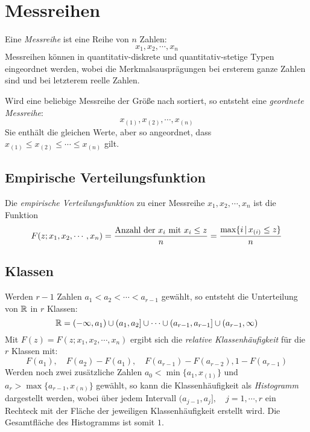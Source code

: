 	\section{Messreihen}
		Eine \textit{Messreihe} ist eine Reihe von \(n\) Zahlen:
		\begin{equation*}
			x_1, x_2, \cdots, x_n
		\end{equation*}
		Messreihen können in quantitativ-diskrete und quantitativ-stetige Typen eingeordnet werden, wobei die Merkmalsausprägungen bei ersterem ganze Zahlen sind und bei letzterem reelle Zahlen.

		Wird eine beliebige Messreihe der Größe nach sortiert, so entsteht eine \textit{geordnete Messreihe}:
		\begin{equation*}
			x_{(1)}, x_{(2)}, \cdots, x_{(n)}
		\end{equation*}
		Sie enthält die gleichen Werte, aber so angeordnet, dass \( x_{(1)} \leq x_{(2)} \leq \cdots \leq x_{(n)} \) gilt.

		\subsection{Empirische Verteilungsfunktion}
			Die \textit{empirische Verteilungsfunktion} zu einer Messreihe \( x_1, x_2, \cdots, x_n \) ist die Funktion
			\begin{equation*}
				F(z; x_1, x_2, \cdots, x_n) = \frac{\textrm{Anzahl der } x_i \textrm{ mit } x_i \leq z}{n} = \frac{\max \{ i \,\vert\, x_{(i)} \leq z \} }{n}
			\end{equation*}

		\subsection{Klassen}
			Werden \( r - 1 \) Zahlen \( a_1 < a_2 < \cdots < a_{r-1} \) gewählt, so entsteht die Unterteilung von \(\mathbb{R}\) in \(r\) Klassen:
			\begin{equation*}
				\mathbb{R} = (-\infty, a_1) \cup (a_1, a_2] \cup \cdots \cup (a_{r-1}, a_{r-1}] \cup (a_{r-1}, \infty)
			\end{equation*}
			Mit \( F(z) = F(z; x_1, x_2, \cdots, x_n) \) ergibt sich die \textit{relative Klassenhäufigkeit} für die \(r\) Klassen mit:
			\begin{equation*}
				F(a_1), \quad F(a_2) - F(a_1), \quad F(a_{r-1}) - F(a_{r-2}), 1 - F(a_{r-1})
			\end{equation*}
			Werden noch zwei zusätzliche Zahlen \( a_0 < \min \{ a_1, x_{(1)} \} \) und \( a_r > \max \{ a_{r-1}, x_{(n)} \} \) gewählt, so kann die Klassenhäufigkeit als \textit{Histogramm} dargestellt werden, wobei über jedem Intervall \( (a_{j-1}, a_j], \quad j = 1, \cdots, r \) ein Rechteck mit der Fläche der jeweiligen Klassenhäufigkeit erstellt wird. Die Gesamtfläche des Histogramms ist somit \(1\).

